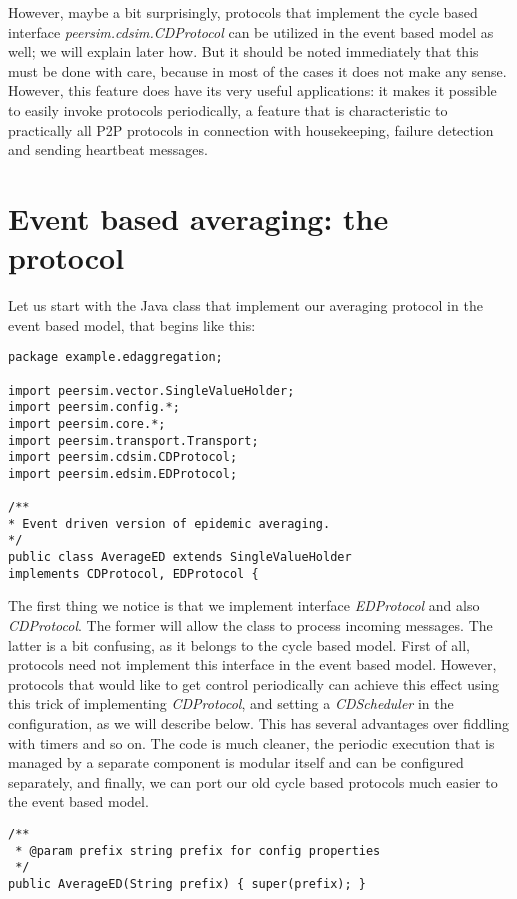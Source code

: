 \documentclass[a4paper,11pt]{article}
\begin{document}
However, maybe a bit surprisingly, protocols that implement the cycle based
interface \emph{peersim.cdsim.CDProtocol} can be utilized in the event
based model as well; we will explain later how.
But it should be noted immediately that this must be done with care, because
in most of the cases it does not make any sense.
However, this feature does have its very useful applications: it makes it
possible to easily invoke protocols periodically, a feature that is
characteristic to practically all P2P protocols in connection with
housekeeping, failure detection and sending heartbeat messages.

\section{Event based averaging: the protocol}

Let us start with the Java class that implement our averaging protocol
in the event based model, that begins like this:
\footnotesize
\begin{verbatim}
package example.edaggregation;

import peersim.vector.SingleValueHolder;
import peersim.config.*;
import peersim.core.*;
import peersim.transport.Transport;
import peersim.cdsim.CDProtocol;
import peersim.edsim.EDProtocol;

/**
* Event driven version of epidemic averaging.
*/
public class AverageED extends SingleValueHolder
implements CDProtocol, EDProtocol {
\end{verbatim}
\normalsize

The first thing we notice is that we implement interface \emph{EDProtocol}
and also \emph{CDProtocol}.
The former will allow the class to process incoming messages.
The latter is a bit confusing, as it belongs to the cycle based model.
First of all, protocols need not implement this interface in the event
based model.
However, protocols that would like to get control periodically can achieve
this effect using this trick of implementing \emph{CDProtocol}, and
setting a \emph{CDScheduler} in the configuration, as we will describe
below.
This has several advantages over fiddling with timers and so on.
The code is much cleaner, the periodic execution that is managed by a separate
component is modular itself and can be configured separately, and finally,
we can port our old cycle based protocols much easier to the event based
model.

\footnotesize
\begin{verbatim}
/**
 * @param prefix string prefix for config properties
 */
public AverageED(String prefix) { super(prefix); }
\end{verbatim}
\normalsize
\end{document}
